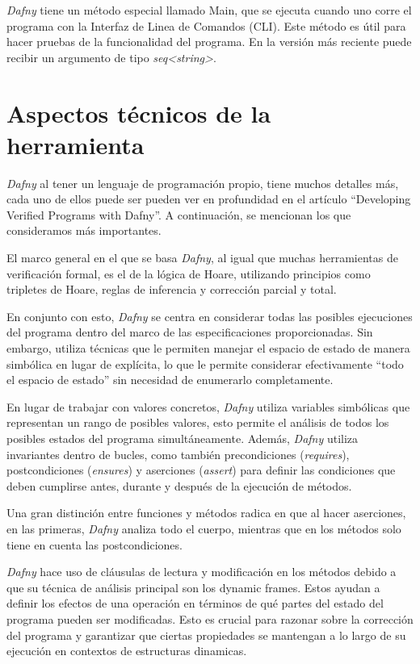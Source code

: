 \documentclass[runningheads]{llncs}
\begin{document}
\textit{Dafny} tiene un método especial llamado Main, que se ejecuta cuando uno corre el programa con la Interfaz de Linea de Comandos (CLI). Este método es útil para hacer pruebas de la funcionalidad del programa.
En la versión más reciente puede recibir un argumento de tipo \textit{seq<string>}.

\section{Aspectos técnicos de la herramienta}
\textit{Dafny} al tener un lenguaje de programación propio, tiene muchos detalles más, cada uno de ellos puede ser pueden ver en profundidad en el artículo 
``Developing Verified Programs with Dafny''\cite{10.1007/978-3-642-27705-4_7}.
A continuación, se mencionan los que consideramos más importantes.

El marco general en el que se basa \textit{Dafny}, al igual que muchas herramientas de verificación formal, es el de la lógica de Hoare,
utilizando principios como tripletes de Hoare, reglas de inferencia y corrección parcial y total.

En conjunto con esto, \textit{Dafny} se centra en considerar todas las posibles ejecuciones del programa dentro del marco de las especificaciones proporcionadas. 
Sin embargo, utiliza técnicas que le permiten manejar el espacio de estado de manera simbólica en lugar de explícita, 
lo que le permite considerar efectivamente ``todo el espacio de estado'' sin necesidad de enumerarlo completamente.

En lugar de trabajar con valores concretos, \textit{Dafny} utiliza variables simbólicas que representan un rango de posibles valores,
esto permite el análisis de todos los posibles estados del programa simultáneamente.
Además, \textit{Dafny} utiliza invariantes dentro de bucles, como también precondiciones (\textit{requires}), postcondiciones (\textit{ensures}) y aserciones (\textit{assert}) para definir las condiciones 
que deben cumplirse antes, durante y después de la ejecución de métodos.

Una gran distinción entre funciones y métodos radica en que al hacer aserciones, en las primeras, \textit{Dafny} analiza todo el cuerpo, mientras que en los métodos solo tiene en cuenta las postcondiciones. 

\textit{Dafny} hace uso de cláusulas de lectura y modificación en los métodos debido a que su técnica de análisis principal son los dynamic frames.
Estos ayudan a definir los efectos de una operación en términos de qué partes del estado del programa pueden ser modificadas. Esto es crucial para razonar sobre la corrección del programa y garantizar que ciertas propiedades se mantengan a lo largo de su ejecución en contextos de estructuras dinamicas.
\end{document}
